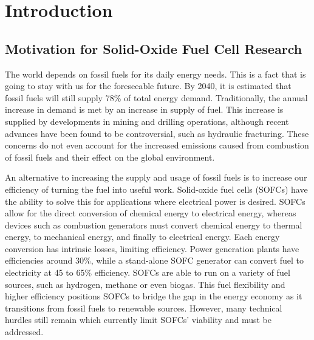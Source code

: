 


\chapter{Introduction}

\section{Motivation for Solid-Oxide Fuel Cell Research}

The world depends on fossil fuels for its daily energy needs.
This is a fact that is going to stay with us for the foreseeable future.
By 2040, it is estimated that fossil fuels will still supply  78\% of total energy demand.\cite{U.S.EnergyInformationAdministration2016}
Traditionally, the annual increase in demand is met by an increase in supply of fuel.
This increase is supplied by developments in mining and drilling operations, although recent advances have been found to be controversial, such as hydraulic fracturing.\cite{Osborn2011,Vengosh2014}
These concerns do not even account for the increased emissions caused from combustion of fossil fuels and their effect on the global environment.\cite{Solomon2009,Hansen1981,U.S.EnvironmentalProtectionAgency2017}

An alternative to increasing the supply and usage of fossil fuels is to increase our efficiency of turning the fuel into useful work.
Solid-oxide fuel cells (SOFCs) have the ability to solve this for applications where electrical power is desired.
SOFCs allow for the direct conversion of chemical energy to electrical energy, whereas devices such as combustion generators must convert chemical energy to thermal energy, to mechanical energy, and finally to electrical energy.
Each energy conversion has intrinsic losses, limiting efficiency.
Power generation plants have efficiencies around 30\%, while a stand-alone SOFC generator can convert fuel to electricity at 45 to 65\% efficiency.\cite{Wachsman2011a,Lasseter2004}
SOFCs are able to run on a variety of fuel sources, such as hydrogen, methane or even biogas.\cite{Park2000,Minh2004}
This fuel flexibility and higher efficiency positions SOFCs to bridge the gap in the energy economy as it transitions from fossil fuels to renewable sources.
However, many technical hurdles still remain which currently limit SOFCs' viability and must be addressed.

